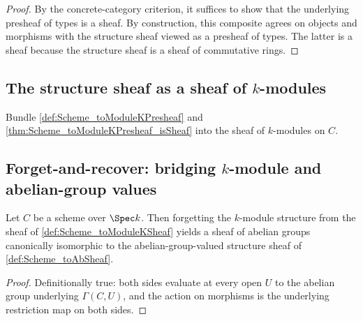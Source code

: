 \begin{proof}
  
  \leanok
  By the concrete-category criterion, it suffices to show that the underlying presheaf of types is a sheaf. By construction, this composite agrees on objects and morphisms with the structure sheaf viewed as a presheaf of types. The latter is a sheaf because the structure sheaf is a sheaf of commutative rings.
\end{proof}

\subsection{The structure sheaf as a sheaf of \(k\)-modules}

\begin{definition}
  \label{def:Scheme_toModuleKSheaf}

  Bundle \cref{def:Scheme_toModuleKPresheaf} and \cref{thm:Scheme_toModuleKPresheaf_isSheaf} into the sheaf of \(k\)-modules on \(C\).
\end{definition}

\subsection{Forget-and-recover: bridging \(k\)-module and abelian-group values}

\begin{definition}
  \label{def:Scheme_toModuleKSheaf_forgetCompare}

  Let \(C\) be a scheme over \(\Spec k\). Then forgetting the \(k\)-module structure from the sheaf of \cref{def:Scheme_toModuleKSheaf} yields a sheaf of abelian groups canonically isomorphic to the abelian-group-valued structure sheaf of \cref{def:Scheme_toAbSheaf}.
\end{definition}

\begin{proof}
  
  \leanok
  Definitionally true: both sides evaluate at every open \(U\) to the abelian group underlying \(\Gamma(C, U)\), and the action on morphisms is the underlying restriction map on both sides.
\end{proof}

